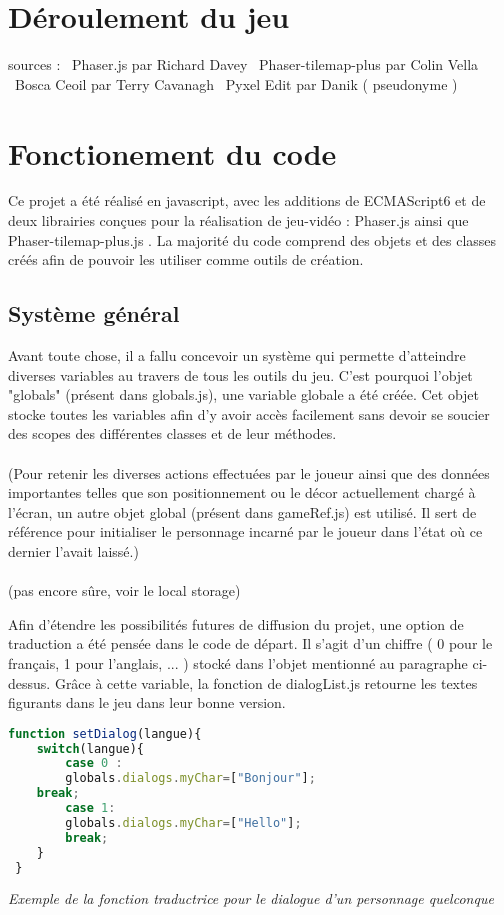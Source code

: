 \documentclass[11pt]{article}
\begin{document}
\section{Déroulement du jeu}
sources : \
Phaser.js par Richard Davey \
Phaser-tilemap-plus par Colin Vella \
Bosca Ceoil par Terry Cavanagh \
Pyxel Edit par Danik ( pseudonyme )\


\section{Fonctionement du code}
Ce projet a été réalisé en javascript, avec les additions de ECMAScript6 et de deux librairies conçues pour la réalisation de jeu-vidéo : Phaser.js ainsi que Phaser-tilemap-plus.js . La majorité du code comprend des objets et des classes créés afin de pouvoir les utiliser comme outils de création.
\subsection{Système général}
	Avant toute chose, il a fallu concevoir un système qui permette d'atteindre diverses variables au travers de tous les outils du jeu. C'est pourquoi l'objet "globals" (présent dans globals.js), une variable globale a été créée. Cet objet stocke toutes les variables afin d'y avoir accès facilement sans devoir se soucier des scopes des différentes classes et de leur méthodes.\\\\
	(Pour retenir les diverses actions effectuées par le joueur ainsi que des données importantes telles que son positionnement ou le décor actuellement chargé à l'écran, un autre objet global (présent dans gameRef.js) est utilisé. Il sert de référence pour initialiser le personnage incarné par le joueur dans l'état où ce dernier l'avait laissé.)\\\\ (pas encore sûre, voir le local storage)
 
 Afin d'étendre les possibilités futures de diffusion du projet, une option de traduction a été pensée dans le code de départ. Il s'agit d'un chiffre ( 0 pour le français, 1 pour l'anglais, ... ) stocké dans l'objet mentionné au paragraphe ci-dessus. Grâce à cette variable, la fonction de dialogList.js retourne les textes figurants dans le jeu dans leur bonne version. \\
 \begin{lstlisting}[language=JavaScript]
 function setDialog(langue){
    switch(langue){
        case 0 : 
        globals.dialogs.myChar=["Bonjour"];
    break;
        case 1:
        globals.dialogs.myChar=["Hello"];
		break;
 	}
 }
\end{lstlisting}
\textit{Exemple de la fonction traductrice pour le dialogue d'un personnage quelconque}
\end{document}
